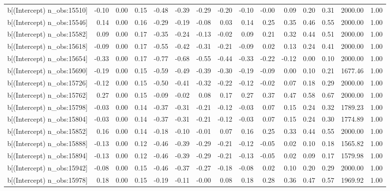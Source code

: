 \begin{table}[ht]
\begin{tabular}{rrrrrrrrrrrrrrr}
  b[(Intercept) n\_obs:15510] & -0.10 & 0.00 & 0.15 & -0.48 & -0.39 & -0.29 & -0.20 & -0.10 & -0.00 & 0.09 & 0.20 & 0.31 & 2000.00 & 1.00 \\ 
  b[(Intercept) n\_obs:15546] & 0.14 & 0.00 & 0.16 & -0.29 & -0.19 & -0.08 & 0.03 & 0.14 & 0.25 & 0.35 & 0.46 & 0.55 & 2000.00 & 1.00 \\ 
  b[(Intercept) n\_obs:15582] & 0.09 & 0.00 & 0.17 & -0.35 & -0.24 & -0.13 & -0.02 & 0.09 & 0.21 & 0.32 & 0.44 & 0.51 & 2000.00 & 1.00 \\ 
  b[(Intercept) n\_obs:15618] & -0.09 & 0.00 & 0.17 & -0.55 & -0.42 & -0.31 & -0.21 & -0.09 & 0.02 & 0.13 & 0.24 & 0.41 & 2000.00 & 1.00 \\ 
  b[(Intercept) n\_obs:15654] & -0.33 & 0.00 & 0.17 & -0.77 & -0.68 & -0.55 & -0.44 & -0.33 & -0.22 & -0.12 & 0.00 & 0.10 & 2000.00 & 1.00 \\ 
  b[(Intercept) n\_obs:15690] & -0.19 & 0.00 & 0.15 & -0.59 & -0.49 & -0.39 & -0.30 & -0.19 & -0.09 & 0.00 & 0.10 & 0.21 & 1677.46 & 1.00 \\ 
  b[(Intercept) n\_obs:15726] & -0.12 & 0.00 & 0.15 & -0.50 & -0.41 & -0.32 & -0.22 & -0.12 & -0.02 & 0.07 & 0.18 & 0.29 & 2000.00 & 1.00 \\ 
  b[(Intercept) n\_obs:15762] & 0.27 & 0.00 & 0.15 & -0.09 & -0.02 & 0.08 & 0.17 & 0.27 & 0.37 & 0.47 & 0.58 & 0.67 & 2000.00 & 1.00 \\ 
  b[(Intercept) n\_obs:15798] & -0.03 & 0.00 & 0.14 & -0.37 & -0.31 & -0.21 & -0.12 & -0.03 & 0.07 & 0.15 & 0.24 & 0.32 & 1789.23 & 1.00 \\ 
  b[(Intercept) n\_obs:15804] & -0.03 & 0.00 & 0.14 & -0.37 & -0.31 & -0.21 & -0.12 & -0.03 & 0.07 & 0.15 & 0.24 & 0.30 & 1774.89 & 1.00 \\ 
  b[(Intercept) n\_obs:15852] & 0.16 & 0.00 & 0.14 & -0.18 & -0.10 & -0.01 & 0.07 & 0.16 & 0.25 & 0.33 & 0.44 & 0.55 & 2000.00 & 1.00 \\ 
  b[(Intercept) n\_obs:15888] & -0.13 & 0.00 & 0.12 & -0.46 & -0.39 & -0.29 & -0.21 & -0.12 & -0.05 & 0.02 & 0.10 & 0.18 & 1565.82 & 1.00 \\ 
  b[(Intercept) n\_obs:15894] & -0.13 & 0.00 & 0.12 & -0.46 & -0.39 & -0.29 & -0.21 & -0.13 & -0.05 & 0.02 & 0.09 & 0.17 & 1579.98 & 1.00 \\ 
  b[(Intercept) n\_obs:15942] & -0.08 & 0.00 & 0.15 & -0.46 & -0.37 & -0.27 & -0.18 & -0.08 & 0.02 & 0.10 & 0.20 & 0.29 & 2000.00 & 1.00 \\ 
  b[(Intercept) n\_obs:15978] & 0.18 & 0.00 & 0.15 & -0.19 & -0.11 & -0.00 & 0.08 & 0.18 & 0.28 & 0.36 & 0.47 & 0.57 & 1969.92 & 1.00 \\ 

\end{tabular}
\end{table}
